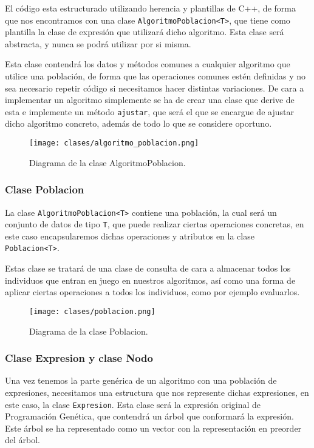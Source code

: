 El código esta estructurado utilizando herencia y plantillas de C++, de forma que nos encontramos con una clase \texttt{AlgoritmoPoblacion<T>}, que tiene como plantilla la clase de expresión que utilizará dicho algoritmo. Esta clase será abstracta, y nunca se podrá utilizar por si misma.

Esta clase contendrá los datos y métodos comunes a cualquier algoritmo que utilice una población, de forma que las operaciones comunes estén definidas y no sea necesario repetir código si necesitamos hacer distintas variaciones. De cara a implementar un algoritmo simplemente se ha de crear una clase que derive de esta e implemente un método \texttt{ajustar}, que será el que se encargue de ajustar dicho algoritmo concreto, además de todo lo que se considere oportuno.

\begin{figure}[H]
	 \centering
	 \texttt{[image: clases/algoritmo\_poblacion.png]}
	 \caption{Diagrama de la clase AlgoritmoPoblacion.}
	\label{fig:diagrama_clase_algoritmo_poblacion}
\end{figure}


\subsubsection{Clase Poblacion}

La clase \texttt{AlgoritmoPoblacion<T>} contiene una población, la cual será un conjunto de datos de tipo \texttt{T}, que puede realizar ciertas operaciones concretas, en este caso encapsularemos dichas operaciones y atributos en la clase \texttt{Poblacion<T>}.

Estas clase se tratará de una clase de consulta de cara a almacenar todos los individuos que entran en juego en nuestros algoritmos, así como una forma de aplicar ciertas operaciones a todos los individuos, como por ejemplo evaluarlos.

\begin{figure}[H]
	 \centering
	 \texttt{[image: clases/poblacion.png]}
	 \caption{Diagrama de la clase Poblacion.}
	\label{fig:diagrama_clase_poblacion}
\end{figure}

\newpage

\subsubsection{Clase Expresion y clase Nodo}

Una vez tenemos la parte genérica de un algoritmo con una población de expresiones, necesitamos una estructura que nos represente dichas expresiones, en este caso, la clase \texttt{Expresion}. Esta clase será la expresión original de Programación Genética, que contendrá un árbol que conformará la expresión. Este árbol se ha representado como un vector con la representación en preorder del árbol.

